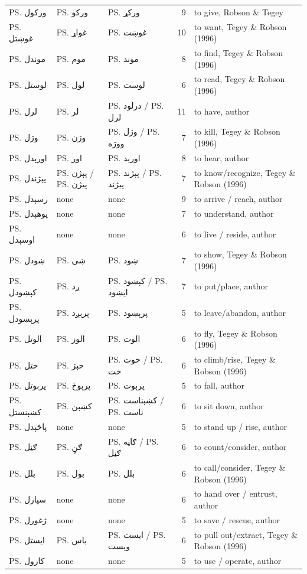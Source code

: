 \begin{longtable}{lllrl}
\ps{ورکول} & \ps{ورکو} & \ps{ورکړ} & 9 & to give, Robson \& Tegey\\
\ps{غوښتل} & \ps{غواړ} & \ps{غوښت} & 10 & to want, Tegey \& Robson (1996)\\
\ps{موندل} & \ps{موم} & \ps{موند} & 8 & to find, Tegey \& Robson (1996)\\
\ps{لوستل} & \ps{لول} & \ps{لوست} & 6 & to read, Tegey \& Robson (1996)\\
\ps{لرل} & \ps{لر} & \ps{درلود} / \ps{لرل} & 11 & to have, author\\
\ps{وژل} & \ps{وژن} & \ps{وژل} / \ps{ووژه} & 7 & to kill, Tegey \& Robson (1996)\\
\ps{اورېدل} & \ps{اور} & \ps{اورېد} & 8 & to hear, author\\
\ps{پېژندل} & \ps{پېژن} / \ps{پیژن} & \ps{پېژند} / \ps{پیژند} & 7 & to know/recognize, Tegey \& Robson (1996)\\
\ps{رسېدل} & none & none & 9 & to arrive / reach, author\\
\ps{پوهېدل} & none & none & 7 & to understand, author\\
\ps{اوسېدل} & none & none & 6 & to live / reside, author\\
\ps{ښودل} & \ps{ښی} & \ps{ښود} & 7 & to show, Tegey \& Robson (1996)\\
\ps{کېښودل} & \ps{ږد} & \ps{کېښود} / \ps{ایښود} & 7 & to put/place, author\\
\ps{پرېښودل} & \ps{پرېږد} & \ps{پرېښود} & 5 & to leave/abandon, author\\
\ps{الوتل} & \ps{الوز} & \ps{الوت} & 6 & to fly, Tegey \& Robson (1996)\\
\ps{ختل} & \ps{خېژ} & \ps{خوت} / \ps{خت} & 6 & to climb/rise, Tegey \& Robson (1996)\\
\ps{پرېوتل} & \ps{پرېوځ} & \ps{پرېوت} & 5 & to fall, author\\
\ps{کښېنستل} & \ps{کښېن} & \ps{کښېناست} / \ps{ناست} & 6 & to sit down, author\\
\ps{پاڅېدل} & none & none & 5 & to stand up / rise, author\\
\ps{ګڼل} & \ps{ګڼ} & \ps{ګاڼه} / \ps{ګڼل} & 6 & to count/consider, author\\
\ps{بلل} & \ps{بول} & \ps{بلل} & 6 & to call/consider, Tegey \& Robson (1996)\\
\ps{سپارل} & none & none & 6 & to hand over / entrust, author\\
\ps{ژغورل} & none & none & 5 & to save / rescue, author\\
\ps{ایستل} & \ps{باس} & \ps{ایست} / \ps{وېست} & 6 & to pull out/extract, Tegey \& Robson (1996)\\
\ps{کارول} & none & none & 5 & to use / operate, author\\
\bottomrule
\end{longtable}
\normalsize

